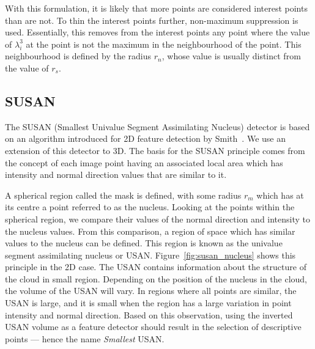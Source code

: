 \documentclass[11pt,a4paper]{kth-mag}
\begin{document}
With this formulation, it is likely that more points are considered interest
points than are not. To thin the interest points further, non-maximum
suppression is used. Essentially, this removes from the interest points any
point where the value of $\lambda^3_i$ at the point is not the maximum in the
neighbourhood of the point. This neighbourhood is defined by the radius $r_{n}$,
whose value is usually distinct from the value of $r_s$.
\subsection{SUSAN}
The SUSAN (Smallest Univalue Segment Assimilating Nucleus) detector is based on
an algorithm introduced for 2D feature detection by Smith~\cite{smith1997susan}.
We use an extension of this detector to 3D. The basis for the SUSAN principle
comes from the concept of each image point having an associated local area which
has intensity and normal direction values that are similar to it.

A spherical region called the mask is defined, with some radius $r_m$ which has
at its centre a point referred to as the nucleus. Looking at the points within
the spherical region, we compare their values of the normal direction and
intensity to the nucleus values. From this comparison, a region of space which
has similar values to the nucleus can be defined. This region is known as the
univalue segment assimilating nucleus or USAN. Figure~\ref{fig:susan_nucleus}
shows this principle in the 2D case. The USAN contains information about the
structure of the cloud in small region. Depending on the position of the nucleus
in the cloud, the volume of the USAN will vary. In regions where all points are
similar, the USAN is large, and it is small when the region has a large
variation in point intensity and normal direction. Based on this observation,
using the inverted USAN volume as a feature detector should result in the
selection of descriptive points --- hence the name \emph{Smallest} USAN.
\end{document}
